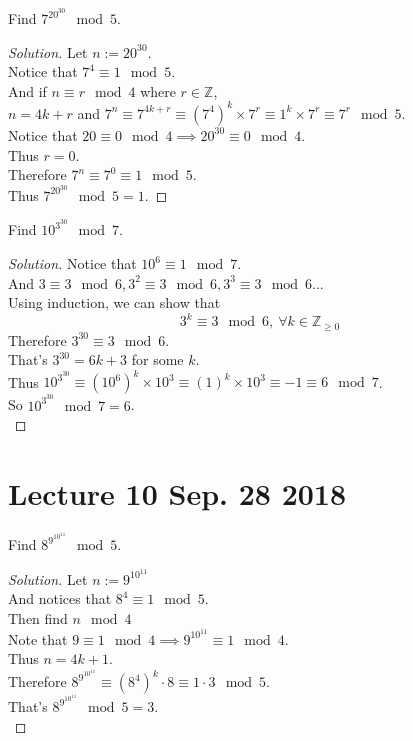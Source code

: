 \documentclass[10pt]{article}
\begin{document}
	\begin{example}
		Find $7^{20^{30}} \mod 5$.
		\begin{proof}[Solution]
			Let $n := 20^{30}$. \\
			Notice that $7^4 \equiv 1 \mod 5$. \\
			And if $n \equiv r \mod 4$ where $r \in \mathbb{Z}$, \\
			$n = 4k+r$ and $7^n \equiv 7^{4k+r} \equiv (7^4)^k \times 7^r \equiv 1^k \times 7^r \equiv 7^r \mod 5$. \\
			Notice that $20 \equiv 0 \mod 4 \implies 20^{30} \equiv 0 \mod 4$. \\
			Thus $r = 0$. \\
			Therefore $7^n \equiv 7^0 \equiv 1 \mod 5$. \\
			Thus $7^{20^{30}} \mod 5 = 1$.
		\end{proof}
	\end{example}
	
	\begin{example}
		Find $10^{3^{30}} \mod 7$.
		\begin{proof}[Solution]
			Notice that $10^6 \equiv 1 \mod 7$. \\
			And $3 \equiv 3 \mod 6, 3^2 \equiv 3 \mod 6, 3^3 \equiv 3 \mod 6 \dots $ \\
			Using induction, we can show that 
			\[
				3^k \equiv 3 \mod 6,\ \forall k \in \mathbb{Z}_{\geq 0}
			\]
			Therefore $3^{30} \equiv 3 \mod 6$. \\
			That's $3^{30} = 6k + 3$ for some $k$. \\
			Thus $10^{3^{30}} \equiv (10^6)^k \times 10^3 \equiv (1)^k \times 10^3 \equiv -1 \equiv 6 \mod 7$. \\
			So $10^{3^{30}} \mod 7 = 6$. \\
		\end{proof}
	\end{example}
	
	\section{Lecture 10 Sep. 28 2018}
	\begin{example}
		Find $8^{9^{10^{11}}} \mod 5$.
	\end{example}
	\begin{proof}[Solution]
		Let $n := 9^{10^{11}}$ \\
		And notices that $8^4 \equiv 1 \mod 5$. \\
		Then find $n \mod 4$ \\
		Note that $9 \equiv 1 \mod 4 \implies 9^{10^{11}} \equiv 1 \mod 4$. \\
		Thus $n = 4k + 1$. \\
		Therefore $8^{9^{{10}^{11}}} \equiv (8^4)^k \cdot 8 \equiv 1 \cdot 3 \mod 5$. \\
		That's $8^{9^{10^{11}}} \mod 5 = 3$. \\
	\end{proof}
	
\end{document}
